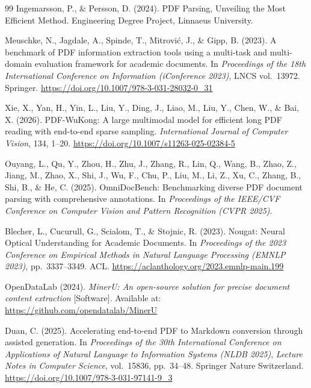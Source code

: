 \documentclass[12pt]{article}
\begin{document}
\begin{thebibliography}{99}
Ingemarsson, P., \& Persson, D. (2024).
PDF Parsing, Unveiling the Most Efficient Method.
Engineering Degree Project, Linnaeus University.

Meuschke, N., Jagdale, A., Spinde, T., Mitrović, J., \& Gipp, B. (2023).
A benchmark of PDF information extraction tools using a multi-task and
multi-domain evaluation framework for academic documents.
In \textit{Proceedings of the 18th International Conference on Information
(iConference 2023)}, LNCS vol.\ 13972. Springer.
\url{https://doi.org/10.1007/978-3-031-28032-0_31}

Xie, X., Yan, H., Yin, L., Liu, Y., Ding, J., Liao, M., Liu, Y., Chen, W., \& Bai, X. (2026).
PDF-WuKong: A large multimodal model for efficient long PDF reading with
end-to-end sparse sampling.
\textit{International Journal of Computer Vision}, 134, 1--20.
\url{https://doi.org/10.1007/s11263-025-02384-5}

Ouyang, L., Qu, Y., Zhou, H., Zhu, J., Zhang, R., Lin, Q., Wang, B., Zhao, Z.,
Jiang, M., Zhao, X., Shi, J., Wu, F., Chu, P., Liu, M., Li, Z., Xu, C.,
Zhang, B., Shi, B., \& He, C. (2025).
OmniDocBench: Benchmarking diverse PDF document parsing with comprehensive
annotations.
In \textit{Proceedings of the IEEE/CVF Conference on Computer Vision and
Pattern Recognition (CVPR 2025)}.


Blecher, L., Cucurull, G., Scialom, T., \& Stojnic, R. (2023).
Nougat: Neural Optical Understanding for Academic Documents.
In \textit{Proceedings of the 2023 Conference on Empirical Methods in Natural
Language Processing (EMNLP 2023)}, pp.\ 3337--3349. ACL.
\url{https://aclanthology.org/2023.emnlp-main.199}

OpenDataLab (2024).
\textit{MinerU: An open-source solution for precise document content extraction}
[Software].
Available at: \url{https://github.com/opendatalab/MinerU}

Duan, C. (2025).
Accelerating end-to-end PDF to Markdown conversion through assisted generation.
In \textit{Proceedings of the 30th International Conference on Applications
of Natural Language to Information Systems (NLDB 2025)},
\textit{Lecture Notes in Computer Science}, vol.\ 15836, pp.\ 34--48.
Springer Nature Switzerland.
\url{https://doi.org/10.1007/978-3-031-97141-9_3}


\end{thebibliography}
\end{document}
